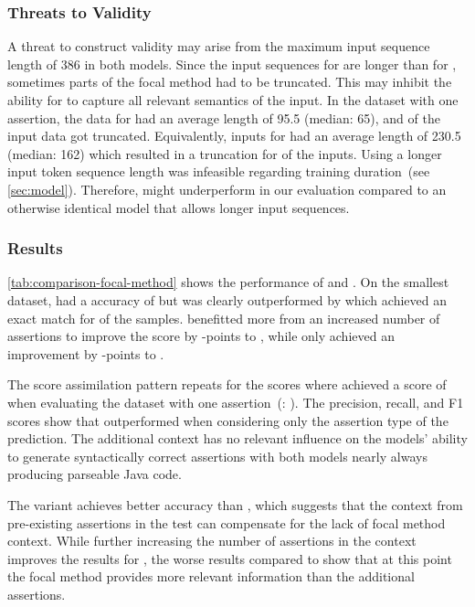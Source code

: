 \subsubsection{Threats to Validity}

A threat to construct validity may arise from the maximum input
sequence length of 386 in both models. Since the input sequences for
\fomet are longer than for \temet, sometimes parts of the focal method
had to be truncated. This may inhibit the ability for \fomet to
capture all relevant semantics of the input.
In the dataset with one assertion, the data for \temet had an average
length of 95.5 (median: 65), and  of the input data got
truncated. Equivalently, inputs for \fomet had an average length of
230.5 (median: 162) which resulted in a truncation for  of
the inputs.
Using a longer input token sequence length was infeasible regarding
training duration~(see \cref{sec:model}). Therefore, \fomet might
underperform in our evaluation compared to an otherwise identical
model that allows longer input sequences.


\subsubsection{Results}



\cref{tab:comparison-focal-method} shows the performance of \temet and
\fomet. On the smallest dataset, \temet[1] had a  accuracy of
 but was clearly outperformed by \fomet[1] which achieved
an exact match for  of the samples.
\temet benefitted more from an increased number of assertions to
improve the score by -points to , while \fomet
only achieved an improvement by -points to .

The score assimilation pattern repeats for the \bleu scores where
\temet[1] achieved a score of  when evaluating the dataset
with one assertion~(\fomet[1]: ).
The precision, recall, and F1 scores show that \fomet outperformed
\temet when considering only the assertion type of the prediction.
The additional context has no relevant influence on the models’
ability to generate syntactically correct assertions with both models
nearly always producing parseable Java code.

The \temet[5] variant achieves better accuracy than \fomet[1], which
suggests that the context from pre-existing assertions in the test can
compensate for the lack of focal method context. While further
increasing the number of assertions in the context improves the
results for \temet[10], the worse results compared to \fomet[5] show
that at this point the focal method provides more relevant information
than the additional assertions.

